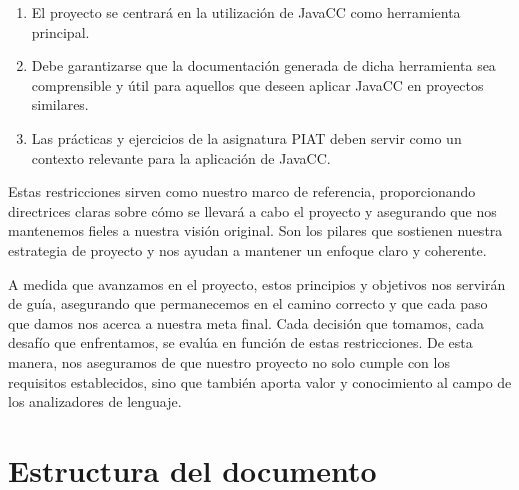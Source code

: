 \begin{enumerate}
    \item El proyecto se centrará en la utilización de JavaCC como herramienta principal. 
    \item Debe garantizarse que la documentación generada de dicha herramienta sea comprensible y útil para aquellos que deseen aplicar JavaCC en proyectos similares.
    \item Las prácticas y ejercicios de la asignatura PIAT deben servir como un contexto relevante para la aplicación de JavaCC.
\end{enumerate}

Estas restricciones sirven como nuestro marco de referencia, proporcionando directrices claras sobre cómo se llevará a cabo el proyecto y asegurando que nos mantenemos fieles a nuestra visión original. Son los pilares que sostienen nuestra estrategia de proyecto y nos ayudan a mantener un enfoque claro y coherente.

A medida que avanzamos en el proyecto, estos principios y objetivos nos servirán de guía, asegurando que permanecemos en el camino correcto y que cada paso que damos nos acerca a nuestra meta final. Cada decisión que tomamos, cada desafío que enfrentamos, se evalúa en función de estas restricciones. De esta manera, nos aseguramos de que nuestro proyecto no solo cumple con los requisitos establecidos, sino que también aporta valor y conocimiento al campo de los analizadores de lenguaje.

\section{Estructura del documento}



